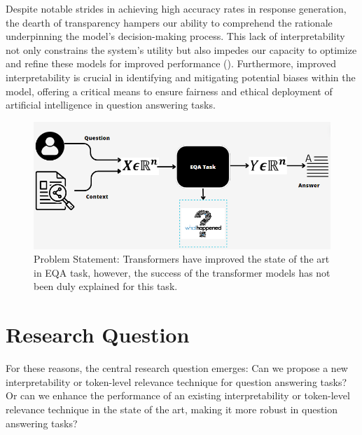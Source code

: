 Despite notable strides in achieving high accuracy rates in response generation, the dearth of transparency hampers our ability to comprehend the rationale underpinning the model's decision-making process. This lack of interpretability not only constrains the system's utility but also impedes our capacity to optimize and refine these models for improved performance (\cite{gao2023improve}). Furthermore, improved interpretability is crucial in identifying and mitigating potential biases within the model, offering a critical means to ensure fairness and ethical deployment of artificial intelligence in question answering tasks.

\begin{figure}[h!]
    \centering%
    \includegraphics[width=\linewidth]{Figures/Preliminares/problem_statement.png}
    \caption{Problem Statement: Transformers have improved the state of the art in EQA task, however, the success of the transformer models has not been duly explained for this task.}
    \label{fig:problem}
\end{figure}

\newpage

\section{Research Question}
For these reasons, the central research question emerges: Can we propose a new interpretability or token-level relevance technique for question answering tasks? Or can we enhance the performance of an existing interpretability or token-level relevance technique in the state of the art, making it more robust in question answering tasks?


